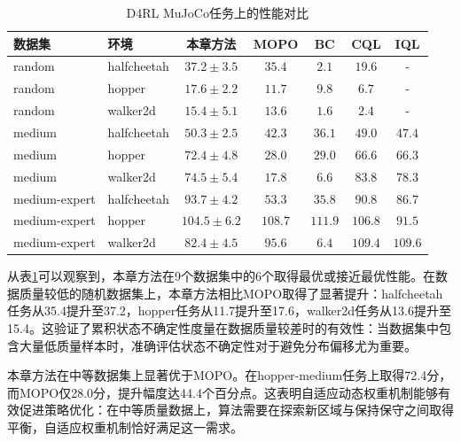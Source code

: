 \begin{table}[htbp]
  \centering
  \caption{D4RL MuJoCo任务上的性能对比}
  \label{Tab:Chap3_main_results}
  \begin{tabular}{llccccc}
    \toprule
    数据集           & 环境          & 本章方法                    & MOPO    & BC               & CQL              & IQL     \\
    \midrule
    random        & halfcheetah & $\mathbf{37.2 \pm 3.5}$ & $35.4$  & $2.1$            & $19.6$           & -       \\
    random        & hopper      & $\mathbf{17.6 \pm 2.2}$ & $11.7$  & $9.8$            & $6.7$            & -       \\
    random        & walker2d    & $\mathbf{15.4 \pm 5.1}$ & $13.6$  & $1.6$            & $2.4$            & -       \\
    medium        & halfcheetah & $\mathbf{50.3 \pm 2.5}$ & $42.3$  & $36.1$           & $49.0$           & $47.4$  \\
    medium        & hopper      & $\mathbf{72.4 \pm 4.8}$ & $28.0$  & $29.0$           & $66.6$           & $66.3$  \\
    medium        & walker2d    & $74.5 \pm 5.4$          & $17.8$  & $6.6$            & $\mathbf{83.8}$  & $78.3$  \\
    medium-expert & halfcheetah & $\mathbf{93.7 \pm 4.2}$ & $53.3$  & $35.8$           & $90.8$           & $86.7$  \\
    medium-expert & hopper      & $104.5 \pm 6.2$         & $108.7$ & $\mathbf{111.9}$ & $106.8$          & $91.5$  \\
    medium-expert & walker2d    & $82.4 \pm 4.5$          & $95.6$  & $6.4$            & $\mathbf{109.4}$ & $109.6$ \\
    \bottomrule
  \end{tabular}
\end{table}

从表\ref{Tab:Chap3_main_results}可以观察到，本章方法在9个数据集中的6个取得最优或接近最优性能。在数据质量较低的随机数据集上，本章方法相比MOPO取得了显著提升：halfcheetah任务从35.4提升至37.2，hopper任务从11.7提升至17.6，walker2d任务从13.6提升至15.4。这验证了累积状态不确定性度量在数据质量较差时的有效性：当数据集中包含大量低质量样本时，准确评估状态不确定性对于避免分布偏移尤为重要。

本章方法在中等数据集上显著优于MOPO。在hopper-medium任务上取得72.4分，而MOPO仅28.0分，提升幅度达44.4个百分点。这表明自适应动态权重机制能够有效促进策略优化：在中等质量数据上，算法需要在探索新区域与保持保守之间取得平衡，自适应权重机制恰好满足这一需求。

